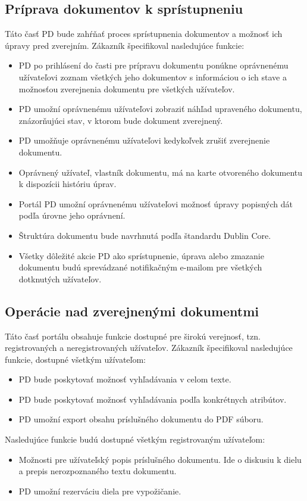 \documentclass[
  digital, %
  table,   %
  lof,     %
  lot,     %
]{fithesis3}
\begin{document}
\subsection{Príprava dokumentov k sprístupneniu}
Táto časť PD bude zahŕňať proces sprístupnenia dokumentov a možnosť ich úpravy pred zverejním. Zákazník špecifikoval nasledujúce funkcie:
\begin{itemize}
	\item PD po prihlásení do časti pre prípravu dokumentu ponúkne oprávnenému užívateľovi zoznam všetkých jeho dokumentov s informáciou o ich stave a možnosťou zverejnenia dokumentu pre všetkých užívateľov.
	\item PD umožní oprávnenému užívateľovi zobraziť náhľad upraveného dokumentu, znázorňujúci stav, v ktorom bude dokument zverejnený.
	\item PD umožňuje oprávnenému užívateľovi kedykoľvek zrušiť zverejnenie dokumentu. 
	\item Oprávnený užívateľ, vlastník dokumentu, má na karte otvoreného dokumentu k dispozícii históriu úprav.
	\item Portál PD umožní oprávnenému užívateľovi možnosť úpravy popisných dát podľa úrovne jeho oprávnení.
	\item Štruktúra dokumentu bude navrhnutá podľa štandardu Dublin Core.
	\item Všetky dôležité akcie PD ako sprístupnenie, úprava alebo zmazanie dokumentu budú sprevádzané notifikačným e-mailom pre všetkých dotknutých užívateľov.
\end{itemize}
\subsection{Operácie nad zverejnenými dokumentmi}
Táto časť portálu obsahuje funkcie dostupné pre širokú verejnosť, tzn. registrovaných a neregistrovaných užívateľov. Zákazník špecifikoval nasledujúce funkcie, dostupné všetkým užívateľom:
\begin{itemize}
	\item PD bude poskytovať možnosť vyhľadávania v celom texte.
	\item PD bude poskytovať možnosť vyhľadávania podľa konkrétnych atribútov.
	\item PD umožní export obsahu príslušného dokumentu do PDF súboru.
\end{itemize}
Nasledujúce funkcie budú dostupné všetkým registrovaným užívateľom:
\begin{itemize}
	\item Možnosti pre užívateľský popis príslušného dokumentu. Ide o diskusiu k dielu a prepis nerozpoznaného textu dokumentu.
	\item PD umožní rezerváciu diela pre vypožičanie.
\end{itemize}
\end{document}
